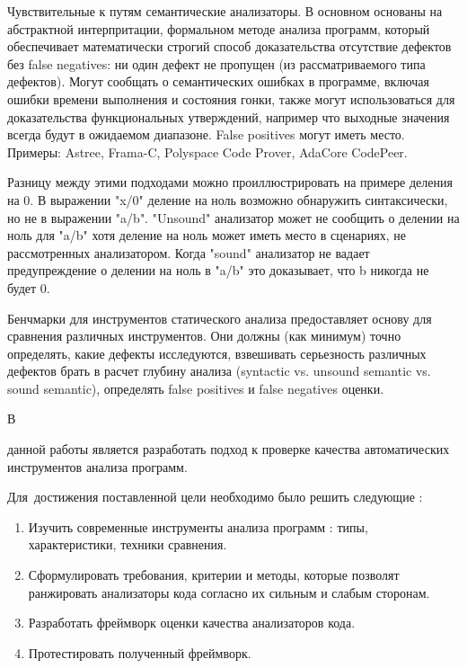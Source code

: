Чувствительные к путям семантические анализаторы. В основном основаны на абстрактной 
интерпритации, формальном методе анализа программ, который обеспечивает математически
строгий способ доказательства отсутствие дефектов без false negatives: ни один дефект 
не пропущен (из рассматриваемого типа дефектов). Могут сообщать о 
семантических ошибках в программе, включая ошибки времени выполнения и состояния гонки,
также могут использоваться для доказательства функциональных утверждений, например что 
выходные значения всегда будут в ожидаемом диапазоне. False positives могут иметь место. 
Примеры: Astree\cite{Astree},
Frama-C\cite{Frama}, Polyspace Code Prover\cite{Polyspace2prover}, 
AdaCore CodePeer\cite{Codepeer}.

Разницу между этими подходами можно проиллюстрировать на примере деления на 0. В выражении 
"x/0" деление на ноль возможно обнаружить синтаксически, но не в выражении "a/b". "Unsound" анализатор 
может не сообщить о делении на ноль для "a/b" хотя деление на ноль может иметь место в сценариях,
не рассмотренных анализатором. Когда "sound" анализатор не вадает предупреждение о делении на ноль
в "a/b" это доказывает, что b никогда не будет 0. 

Бенчмарки для инструментов статического анализа предоставляет основу для сравнения
различных инструментов. Они должны (как минимум) точно определять, какие дефекты исследуются,
взвешивать серьезность различных дефектов %
брать в расчет глубину анализа (syntactic vs. unsound semantic vs. sound semantic), определять
false positives и false negatives оценки.

В 



{\aim} данной работы является разработать подход к проверке качества автоматических инструментов анализа программ.

Для~достижения поставленной цели необходимо было решить следующие {\tasks}:
\begin{enumerate}[beginpenalty=10000] %
  \item Изучить современные инструменты анализа программ : типы, характеристики, техники сравнения.  
  \item Сформулировать требования, критерии и методы, которые позволят ранжировать анализаторы кода
      согласно их сильным и слабым сторонам.
  \item Разработать фреймворк оценки качества анализаторов кода. 
  \item Протестировать полученный фреймворк.
\end{enumerate}


